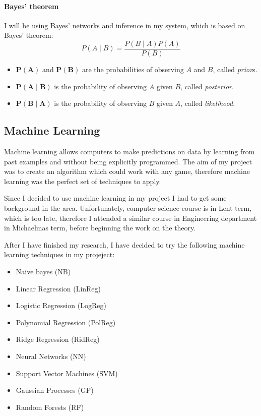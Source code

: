 \documentclass[12pt,a4paper]{book}
\begin{document}
\paragraph{Bayes' theorem}
I will be using Bayes' networks and inference in my system, which is based on Bayes' theorem:
\begin{equation*}
P(A\mid B) = \frac{P(B\mid A)P(A)}{P(B)}
\end{equation*}
\begin{itemize}
\item $\boldsymbol{P(A)}$ and $\boldsymbol{P(B)}$ are the probabilities of observing $A$ and $B$, called \emph{prior}s.
\item $\boldsymbol{P(A \mid B)}$ is the probability of observing $A$ given $B$, called \emph{posterior}.
\item $\boldsymbol{P(B \mid A)}$ is the probability of observing $B$ given $A$, called \emph{likelihood}.
\end{itemize}
\subsection{Machine Learning}
Machine learning allows computers to make predictions on data by learning from past examples and without being explicitly programmed.
The aim of my project was to create an algorithm which could work with any game, therefore machine learning was the perfect set of techniques to apply.

Since I decided to use machine learning in my project I had to get some background in the area.
Unfortunately, computer science course is in Lent term, which is too late, therefore I attended a similar course in Engineering department in Michaelmas term, before beginning the work on the theory.

After I have finished my research, I have decided to try the following machine learning techniques in my projeject:
\begin{itemize}
\item Naive bayes (NB)
\item Linear Regression (LinReg)
\item Logistic Regression (LogReg)
\item Polynomial Regression (PolReg)
\item Ridge Regression (RidReg)
\item Neural Networks (NN)
\item Support Vector Machines (SVM)
\item Gaussian Processes (GP)
\item Random Forests (RF)
\end{itemize}
\end{document}
